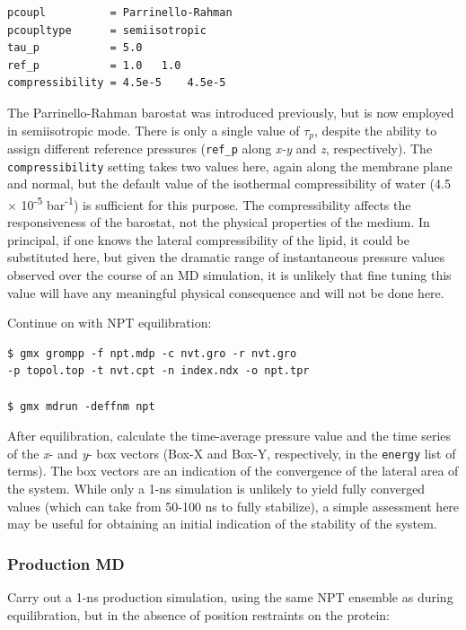 \documentclass[9pt,tutorial]{livecoms}
\begin{document}
\begin{verbatim}
pcoupl          = Parrinello-Rahman
pcoupltype      = semiisotropic
tau_p           = 5.0
ref_p           = 1.0   1.0
compressibility = 4.5e-5    4.5e-5
\end{verbatim}

The Parrinello-Rahman barostat was introduced previously, but is now employed in semiisotropic mode. There is only a single value of $\tau_p$, despite the ability to assign different reference pressures (\texttt{ref\_p} along {\em x-y} and {\em z}, respectively). The \texttt{compressibility} setting takes two values here, again along the membrane plane and normal, but the default value of the isothermal compressibility of water (4.5 $\times$ 10\textsuperscript{-5} bar\textsuperscript{-1}) is sufficient for this purpose. The compressibility affects the responsiveness of the barostat, not the physical properties of the medium. In principal, if one knows the lateral compressibility of the lipid, it could be substituted here, but given the dramatic range of instantaneous pressure values observed over the course of an MD simulation, it is unlikely that fine tuning this value will have any meaningful physical consequence and will not be done here.

Continue on with NPT equilibration:

\begin{verbatim}
$ gmx grompp -f npt.mdp -c nvt.gro -r nvt.gro
-p topol.top -t nvt.cpt -n index.ndx -o npt.tpr

$ gmx mdrun -deffnm npt
\end{verbatim}

After equilibration, calculate the time-average pressure value and the time series of the {\em x}- and {\em y}- box vectors (Box-X and Box-Y, respectively, in the \texttt{energy} list of terms). The box vectors are an indication of the convergence of the lateral area of the system. While only a 1-ns simulation is unlikely to yield fully converged values (which can take from 50-100 ns to fully stabilize), a simple assessment here may be useful for obtaining an initial indication of the stability of the system.

\subsubsection{Production MD} \label{kalp_md}

Carry out a 1-ns production simulation, using the same NPT ensemble as during equilibration, but in the absence of position restraints on the protein:
\end{document}
